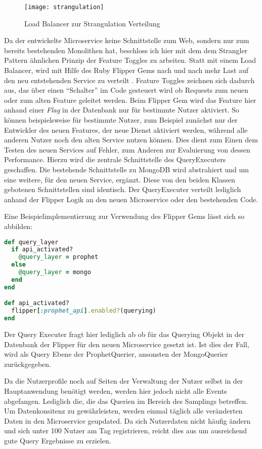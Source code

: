 \begin{figure}[h]
    \caption{Load Balancer zur Strangulation Verteilung \cite{Hammant:Strangler}}
    \texttt{[image: strangulation]}
\end{figure}

Da der entwickelte Microservice keine Schnittstelle zum Web, sondern nur zum bereits bestehenden Monolithen hat, beschloss ich hier mit dem dem Strangler Pattern ähnlichen Prinzip der Feature Toggles\cite{fowler:featuretoggle} zu arbeiten. Statt mit einem Load Balancer, wird mit Hilfe des Ruby Flipper Gems\cite{flipper} nach und nach mehr Last auf den neu entstehenden Service zu verteilt \cite[vgl.][]{Hammant:Strangler}.
Feature Toggles zeichnen sich dadurch aus, das über einen ``Schalter'' im Code gesteuert wird ob Requests zum neuen oder zum alten Feature geleitet werden. Beim Flipper Gem wird das Feature hier anhand einer \textit{Flag} in der Datenbank nur für bestimmte Nutzer aktiviert. So können beispielsweise für bestimmte Nutzer, zum Beispiel zunächst nur der Entwickler des neuen Features, der neue Dienst aktiviert werden, während alle anderen Nutzer noch den alten Service nutzen können. Dies dient zum Einen dem Testen des neuen Services auf Fehler, zum Anderen zur Evaluierung von dessen Performance.
Hierzu wird die zentrale Schnittstelle des QueryExecuters geschaffen. Die bestehende Schnittstelle zu MongoDB wird abstrahiert und um eine weitere, für den neuen Service, ergänzt. Diese von den beiden Klassen gebotenen Schnittstellen sind identisch. Der QueryExecuter verteilt lediglich anhand der Flipper Logik an den neuen Microservice oder den bestehenden Code.

Eine Beispielimplementierung zur Verwendung des Flipper Gems lässt sich so abbilden:
\begin{lstlisting}[language=Ruby]
def query_layer
  if api_activated?
    @query_layer = prophet
  else
    @query_layer = mongo
  end
end

def api_activated?
  flipper[:prophet_api].enabled?(querying)
end
\end{lstlisting}
Der Query Executer fragt hier lediglich ab ob für das Querying Objekt in der Datenbank der Flipper für den neuen Microservice gesetzt ist. Ist dies der Fall, wird als Query Ebene der ProphetQuerier, ansonsten der MongoQuerier zurückgegeben.

Da die Nutzerprofile noch auf Seiten der Verwaltung der Nutzer selbst in der Hauptanwendung benötigt werden, werden hier jedoch nicht alle Events abgefangen. Lediglich die, die das Querien im Bereich des Samplings betreffen. Um Datenkonsitenz zu gewährleisten, werden einmal täglich alle veränderten Daten in den Microservice geupdated. Da sich Nutzerdaten nicht häufig ändern und sich unter 100 Nutzer am Tag registrieren, reicht dies aus um ausreichend gute Query Ergebnisse zu erzielen.